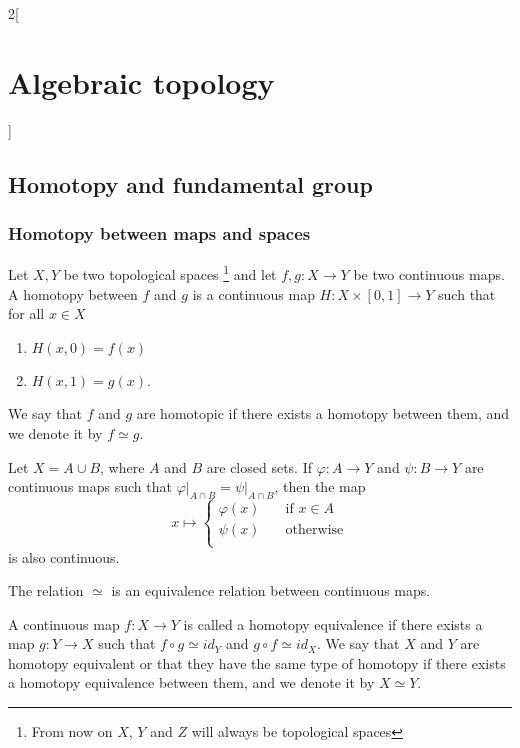 \documentclass[../../../main.tex]{subfiles}
\begin{document}
\renewcommand{\col}{\geo}
\begin{multicols}{2}[\section{Algebraic topology}]
  	\subsection{Homotopy and fundamental group}
  	\subsubsection{Homotopy between maps and spaces}
  	
  	\begin{definition}
	  	Let $X,Y$ be two topological spaces \footnote{From now on $X$, $Y$ and $Z$ will always be topological spaces} and let $f,g: X \to Y$ be two continuous maps. A homotopy between $f$ and $g$ is a continuous map $H:X\times [0,1] \to Y$ such that for all $x\in X$
	  	\begin{enumerate}
		  		\item $H(x,0)=f(x)$
		  		\item $H(x,1)=g(x)$.
		\end{enumerate}
		We say that $f$ and $g$ are homotopic if there exists a homotopy between them, and we denote it by $f\simeq g$.
	\end{definition}
	  
	\begin{lemma}
	    Let $X=A\cup B$, where $A$ and $B$ are closed sets. If $\varphi: A \to Y$ and $\psi: B \to Y$ are continuous maps such that $\left.\varphi \right|_{A\cap B}=\left.\psi \right|_{A\cap B}$, then the map $$x\mapsto \begin{cases}
	    	\varphi(x) & \quad\text{if  } x\in A \\
	    	\psi(x)  & \quad\text{otherwise}\\
		\end{cases}$$ is also continuous.
	\end{lemma}
	
	\begin{proposition}
		The relation $\simeq$ is an equivalence relation between continuous maps.
    \end{proposition}
		
	\begin{definition}
		A continuous map $f:X\to Y$ is called a homotopy equivalence if there exists a map $g:Y\to X$ such that $f\circ g\simeq id_Y$ and $g\circ f \simeq id_X$. We say that $X$ and $Y$ are homotopy equivalent or that they have the same type of homotopy if there exists a homotopy equivalence between them, and we denote it by $X\simeq Y$.
	\end{definition}


\end{multicols}
\end{document}
